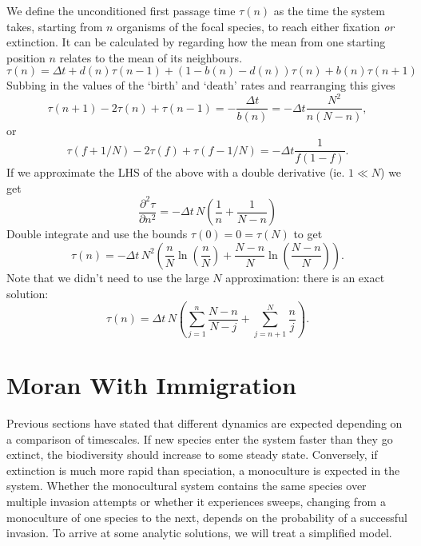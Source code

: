 We define the unconditioned first passage time $\tau(n)$ as the time the system takes, starting from $n$ organisms of the focal species, to reach either fixation \emph{or} extinction.
It can be calculated by regarding how the mean from one starting position $n$ relates to the mean of its neighbours.
\begin{equation}
\tau(n) = \Delta t + d(n)\tau(n-1) + \left(1-b(n)-d(n)\right)\tau(n) + b(n)\tau(n+1)
\end{equation}
Subbing in the values of the `birth' and `death' rates and rearranging this gives
\begin{equation}
\tau(n+1) - 2\tau(n) + \tau(n-1) = -\frac{\Delta t}{b(n)} = -\Delta t\frac{N^2}{n(N-n)},
\end{equation}
or
\begin{equation}
\tau(f+1/N) - 2\tau(f) + \tau(f-1/N) = -\Delta t\frac{1}{f(1-f)}.
\end{equation}
If we approximate the LHS of the above with a double derivative (ie. $1\ll N$) we get
\begin{equation}
\frac{\partial^2\tau}{\partial n^2} = -\Delta t\,N\left(\frac{1}{n}+\frac{1}{N-n}\right)
\end{equation}
Double integrate and use the bounds $\tau(0) = 0 = \tau(N)$ to get
\begin{equation}
\tau(n) = -\Delta t\,N^2\left(\frac{n}{N}\ln\left(\frac{n}{N}\right)+\frac{N-n}{N}\ln\left(\frac{N-n}{N}\right)\right).
\end{equation}
Note that we didn't need to use the large $N$ approximation: there is an exact solution:
\begin{equation}
\tau(n) = \Delta t\,N\left(\sum_{j=1}^n\frac{N-n}{N-j} + \sum_{j=n+1}^N\frac{n}{j}\right).
\end{equation}


\section{Moran With Immigration}
Previous sections have stated that different dynamics are expected depending on a comparison of timescales. 
If new species enter the system faster than they go extinct, the biodiversity should increase to some steady state. 
Conversely, if extinction is much more rapid than speciation, a monoculture is expected in the system. 
Whether the monocultural system contains the same species over multiple invasion attempts or whether it experiences sweeps, changing from a monoculture of one species to the next, depends on the probability of a successful invasion. 
To arrive at some analytic solutions, we will treat a simplified model. 

